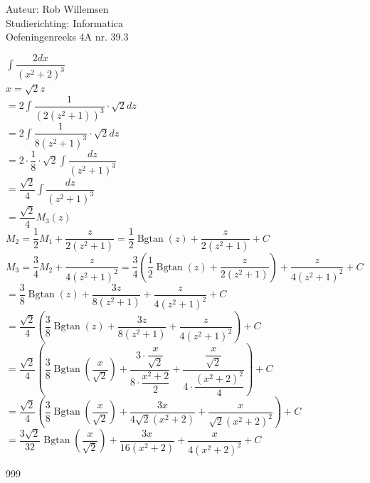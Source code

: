 \documentclass[a4paper]{article}
\newcommand{\dint}{\displaystyle\int}
\newcommand{\Bgtan}{\operatorname{Bgtan}}
\begin{document}
\noindent \large Auteur: Rob Willemsen \\
\noindent \large Studierichting: Informatica \\
\noindent \large Oefeningenreeks 4A nr. 39.3 \\

\medskip

\normalsize

$\dint \dfrac{2dx}{(x^2+2)^3}$ \\

$x = \sqrt{2}z$ \\

$= 2 \dint \dfrac{1}{(2(z^2+1))^3} \cdot \sqrt{2} dz$ \\

$= 2 \dint \dfrac{1}{8(z^2+1)^3} \cdot \sqrt{2} dz$ \\

$= 2 \cdot \dfrac{1}{8} \cdot \sqrt{2} \dint \dfrac{dz}{(z^2+1)^3}$ \\

$= \dfrac{\sqrt{2}}{4} \dint \dfrac{dz}{(z^2+1)^3}$ \\

$= \dfrac{\sqrt{2}}{4} M_3(z)$ \\

$M_2 = \dfrac{1}{2}M_1 + \dfrac{z}{2(z^2+1)} = \dfrac{1}{2} \Bgtan(z) + \dfrac{z}{2(z^2+1)} + C$ \\

$M_3 = \dfrac{3}{4}M_2 + \dfrac{z}{4(z^2+1)^2} = \dfrac{3}{4}\left(\dfrac{1}{2} \Bgtan(z) + \dfrac{z}{2(z^2+1)}\right) + \dfrac{z}{4(z^2+1)^2} + C$ \\

$= \dfrac{3}{8} \Bgtan(z) + \dfrac{3z}{8(z^2+1)} + \dfrac{z}{4(z^2+1)^2} + C$ \\

$= \dfrac{\sqrt{2}}{4} \left(\dfrac{3}{8} \Bgtan(z) + \dfrac{3z}{8(z^2+1)} + \dfrac{z}{4(z^2+1)^2}\right) + C$ \\

$= \dfrac{\sqrt{2}}{4} \left(\dfrac{3}{8} \Bgtan\left(\dfrac{x}{\sqrt{2}}\right) + \dfrac{3 \cdot \dfrac{x}{\sqrt{2}}}{8 \cdot \dfrac{x^2+2}{2}} + \dfrac{\dfrac{x}{\sqrt{2}}}{4 \cdot \dfrac{(x^2+2)^2}{4}}\right) + C$ \\

$= \dfrac{\sqrt{2}}{4} \left(\dfrac{3}{8} \Bgtan\left(\dfrac{x}{\sqrt{2}}\right) + \dfrac{3x}{4\sqrt{2}(x^2+2)} + \dfrac{x}{\sqrt{2}(x^2+2)^2}\right) + C$ \\

$= \dfrac{3\sqrt{2}}{32} \Bgtan\left(\dfrac{x}{\sqrt{2}}\right) + \dfrac{3x}{16(x^2+2)} + \dfrac{x}{4(x^2+2)^2} + C$ \\


\begin{thebibliography}{999}
\end{thebibliography}
\end{document}
